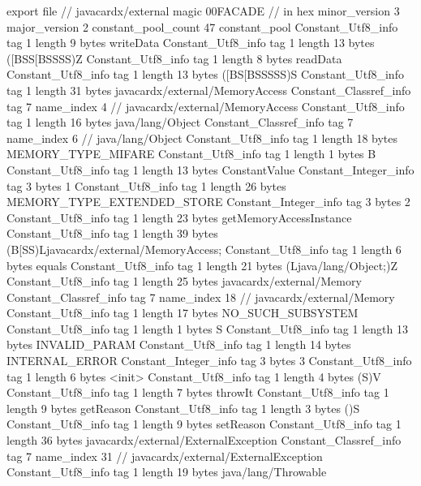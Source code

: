 export file {		// javacardx/external
	magic	00FACADE		 // in hex
	minor_version	3
	major_version	2
	constant_pool_count	47
	constant_pool {
		Constant_Utf8_info {
			tag	1
			length	9
			bytes	writeData
		}
		Constant_Utf8_info {
			tag	1
			length	13
			bytes	([BSS[BSSSS)Z
		}
		Constant_Utf8_info {
			tag	1
			length	8
			bytes	readData
		}
		Constant_Utf8_info {
			tag	1
			length	13
			bytes	([BS[BSSSSS)S
		}
		Constant_Utf8_info {
			tag	1
			length	31
			bytes	javacardx/external/MemoryAccess
		}
		Constant_Classref_info {
			tag	7
			name_index	4		// javacardx/external/MemoryAccess
		}
		Constant_Utf8_info {
			tag	1
			length	16
			bytes	java/lang/Object
		}
		Constant_Classref_info {
			tag	7
			name_index	6		// java/lang/Object
		}
		Constant_Utf8_info {
			tag	1
			length	18
			bytes	MEMORY_TYPE_MIFARE
		}
		Constant_Utf8_info {
			tag	1
			length	1
			bytes	B
		}
		Constant_Utf8_info {
			tag	1
			length	13
			bytes	ConstantValue
		}
		Constant_Integer_info {
			tag	3
			bytes	1
		}
		Constant_Utf8_info {
			tag	1
			length	26
			bytes	MEMORY_TYPE_EXTENDED_STORE
		}
		Constant_Integer_info {
			tag	3
			bytes	2
		}
		Constant_Utf8_info {
			tag	1
			length	23
			bytes	getMemoryAccessInstance
		}
		Constant_Utf8_info {
			tag	1
			length	39
			bytes	(B[SS)Ljavacardx/external/MemoryAccess;
		}
		Constant_Utf8_info {
			tag	1
			length	6
			bytes	equals
		}
		Constant_Utf8_info {
			tag	1
			length	21
			bytes	(Ljava/lang/Object;)Z
		}
		Constant_Utf8_info {
			tag	1
			length	25
			bytes	javacardx/external/Memory
		}
		Constant_Classref_info {
			tag	7
			name_index	18		// javacardx/external/Memory
		}
		Constant_Utf8_info {
			tag	1
			length	17
			bytes	NO_SUCH_SUBSYSTEM
		}
		Constant_Utf8_info {
			tag	1
			length	1
			bytes	S
		}
		Constant_Utf8_info {
			tag	1
			length	13
			bytes	INVALID_PARAM
		}
		Constant_Utf8_info {
			tag	1
			length	14
			bytes	INTERNAL_ERROR
		}
		Constant_Integer_info {
			tag	3
			bytes	3
		}
		Constant_Utf8_info {
			tag	1
			length	6
			bytes	<init>
		}
		Constant_Utf8_info {
			tag	1
			length	4
			bytes	(S)V
		}
		Constant_Utf8_info {
			tag	1
			length	7
			bytes	throwIt
		}
		Constant_Utf8_info {
			tag	1
			length	9
			bytes	getReason
		}
		Constant_Utf8_info {
			tag	1
			length	3
			bytes	()S
		}
		Constant_Utf8_info {
			tag	1
			length	9
			bytes	setReason
		}
		Constant_Utf8_info {
			tag	1
			length	36
			bytes	javacardx/external/ExternalException
		}
		Constant_Classref_info {
			tag	7
			name_index	31		// javacardx/external/ExternalException
		}
		Constant_Utf8_info {
			tag	1
			length	19
			bytes	java/lang/Throwable
}}}
